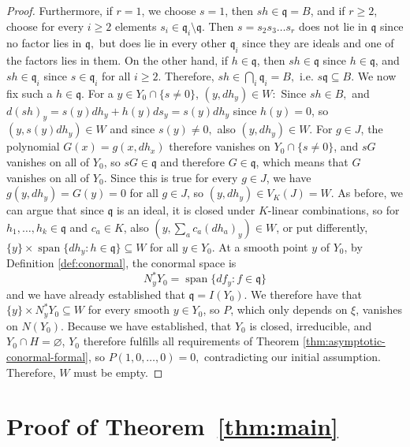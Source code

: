 \documentclass[pdflatex,sn-mathphys-num]{sn-jnl}
\numberwithin{equation}{section}
\theoremstyle{thmstyleone}
\theoremstyle{thmstyletwo}
\begin{document}
\begin{proof}
Furthermore, if $r = 1$, we choose $s = 1$, then $sh \in \mathfrak q = B$, and if $r\geq 2$, choose for every $i\geq 2$ elements $s_i \in \mathfrak q_i \setminus \mathfrak q$. Then $s = s_2s_3\dots s_r$ does not lie in $\mathfrak q$ since no factor lies in $\mathfrak q,$ but does lie in every other $\mathfrak q_i$ since they are ideals and one of the factors lies in them. On the other hand, if $h \in \mathfrak q$, then $sh \in \mathfrak q$ since $h\in \mathfrak q$, and $sh \in \mathfrak q_i$ since $s \in \mathfrak q_i$ for all $i\geq 2$. Therefore, $sh \in \bigcap_i \mathfrak q_i = B,$ i.e. $s\mathfrak q \subseteq B.$ We now fix such a $h \in \mathfrak q.$ For a $y \in Y_0\cap\{s\neq0\}$, $(y, dh_y) \in W:$
Since $sh \in B,$ and $d(sh)_y = s(y)dh_y+h(y)ds_y = s(y)dh_y$ since $h(y) = 0$, so $(y, s(y)dh_y) \in W$ and since $s(y)\neq 0,$ also $(y, dh_y)\in W$. 
For $g\in J$, the polynomial $G(x)=g(x,dh_x)$ therefore vanishes on $Y_0\cap\{s\neq0\}$, and $sG$ vanishes on all of $Y_0$, so $sG \in \mathfrak q$ and therefore $G \in \mathfrak q$, which means that $G$ vanishes on all of $Y_0$. Since this is true for every $g \in J$, we have $g(y, dh_y) = G(y) = 0$ for all $g\in J$, so $(y,dh_y) \in V_K(J)= W.$  As before, we can argue that since $\mathfrak q$ is an ideal, it is closed under $K$-linear combinations, so for $h_1,\dots ,h_k \in \mathfrak q$ and $c_a \in K$, also $(y, \sum_a c_a (dh_a)_y) \in W$, or put differently, $\{y\} \times \operatorname{span}\{dh_y: h \in \mathfrak q\} \subseteq W$ for all $y \in Y_0$. At a smooth point $y$ of $Y_0$, by Definition \ref{def:conormal}, the conormal space is 
\[N_y^*Y_0 = \operatorname{span}\{df_y : f \in \mathfrak q\}\]
and we have already established that $\mathfrak q = I(Y_0)$. We therefore have that $\{y\} \times N_y^*Y_0 \subseteq  W$ for every smooth $y \in Y_0$, so $P$, which only depends on $\xi$, vanishes on $N(Y_0)$. Because we have established, that $Y_0$ is closed, irreducible, and $Y_0 \cap H = \varnothing $, $Y_0$ therefore fulfills all requirements of Theorem \ref{thm:asymptotic-conormal-formal}, so $P(1,0,\dots,0) = 0,$ contradicting our initial assumption. Therefore, $W$ must be empty.
\end{proof}




\section{Proof of Theorem~\ref{thm:main}}\label{sec:proof}
\end{document}
